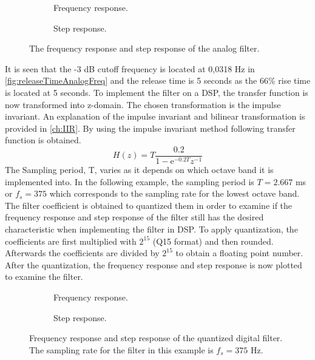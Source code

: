 \begin{figure}[H]
\centering
\begin{subfigure}[t]{0.7\textwidth}
	
	\caption{Frequency response.}
	\label{fig:releaseTimeAnalogFreq}
\end{subfigure}
\begin{subfigure}[t]{0.7\textwidth}
	
	\caption{Step response.}
	\label{fig:releaseTimeAnalogStep}
\end{subfigure}
\caption{The frequency response and step response of the analog filter.}
\label{fig:releaseTimeAnalog}
\end{figure}

It is seen that the -3 dB cutoff frequency is located at 0,0318 Hz in \autoref{fig:releaseTimeAnalogFreq} and the release time is 5 seconds as the 66\% rise time is located at 5 seconds. To implement the filter on a DSP, the transfer function is now transformed into z-domain. The chosen transformation is the impulse invariant. An explanation of the impulse invariant and bilinear transformation is provided in \autoref{ch:IIR}. By using the impulse invariant method following transfer function is obtained.
\begin{equation} \label{eq:releaseTF}
H(z) = T\frac{0.2}{1-\text{e}^{-0.2T} z^{-1}}
\end{equation} 
The Sampling period, T, varies as it depends on which octave band it is implemented into. In the following example, the sampling period is $T = 2.667$ ms or $f_s = 375$ which corresponds to the sampling rate for the lowest octave band. The filter coefficient is obtained to quantized them in order to examine if the frequency response and step response of the filter still has the desired characteristic when implementing the filter in DSP. To apply quantization, the coefficients are first multiplied with $2^{15}$ (Q15 format) and then rounded. Afterwards the coefficients are divided by $2^{15}$ to obtain a floating point number. After the quantization, the frequency response and step response is now plotted to examine the filter.

\begin{figure}[H]
\centering
\begin{subfigure}[t]{0.7\textwidth}
	
	\caption{Frequency response.}
	\label{fig:releaseTimeDigitalFreq}
\end{subfigure}
\begin{subfigure}[t]{0.7\textwidth}
	
	\caption{Step response.}
	\label{fig:releaseTimeDigitalStep}
\end{subfigure}
\caption{Frequency response and step response of the quantized digital filter. The sampling rate for the filter in this example is $f_s = 375$ Hz.}
\label{fig:releaseTime}
\end{figure}


